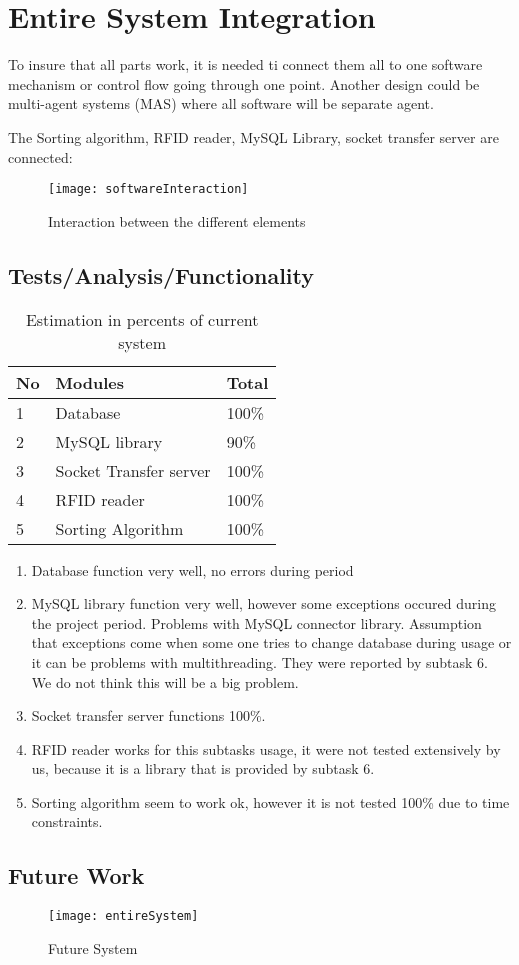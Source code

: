 %
\section{Entire System Integration}

To insure that all parts work, it is needed ti connect them all to one software mechanism or control flow going through one point. Another design could be multi-agent systems (MAS) where all software will be separate agent.

The Sorting algorithm, RFID reader, MySQL Library, socket transfer server are connected:

\begin{figure}[h]
	\centering
		\texttt{[image: softwareInteraction]}
	\caption{Interaction between the different elements}
	\label{fig:softwareInteraction}
\end{figure}


\subsection{Tests/Analysis/Functionality}

\begin{table}[h]
	
    \begin{tabular}{ | p{0.5cm} | p{3.8cm} |p{1cm} |}
    \hline
	No & Modules & Total\\ \hline
	1 & Database & 100\% \\ \hline
	2 & MySQL library &  90\% \\ \hline
	3 & Socket Transfer server &  100\% \\ \hline
	4 & RFID reader &  100\% \\ \hline
	5 & Sorting Algorithm &  100\% \\ \hline
    \end{tabular}
	\caption{Estimation in percents of current system}
	\label{tab:percentSystem}
\end{table}

\begin{enumerate}
	\item Database function very well, no errors during period
	\item MySQL library function very well, however some exceptions occured during the project period. Problems with MySQL connector library. Assumption that exceptions come when some one tries to change database during usage or it can be problems with multithreading. They were reported by subtask 6. We do not think this will be a big problem.
	\item Socket transfer server functions 100\%.
	\item RFID reader works for this subtasks usage, it were not tested extensively by us, because it is a library that is provided by subtask 6.
	\item Sorting algorithm seem to work ok, however it is not tested 100\% due to time constraints.
\end{enumerate}

\subsection{Future Work}

\begin{figure}[h]
	\centering
		\texttt{[image: entireSystem]}
	\caption{Future System}
	\label{fig:entireSystem}
\end{figure}